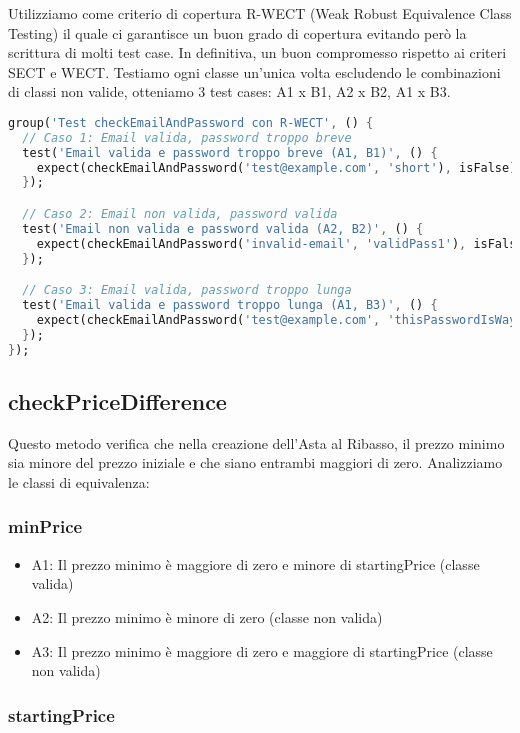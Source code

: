 \noindent
Utilizziamo come criterio di copertura R-WECT (Weak Robust Equivalence Class Testing) il quale ci garantisce un buon grado di copertura evitando però la scrittura di molti test case. In definitiva, un buon compromesso rispetto ai criteri SECT e WECT.\meskip
Testiamo ogni classe un'unica volta escludendo le combinazioni di classi non valide, otteniamo 3 test cases: A1 x B1, A2 x B2, A1 x B3.

\begin{lstlisting}[language=Dart]
group('Test checkEmailAndPassword con R-WECT', () {
  // Caso 1: Email valida, password troppo breve
  test('Email valida e password troppo breve (A1, B1)', () {
    expect(checkEmailAndPassword('test@example.com', 'short'), isFalse);
  });

  // Caso 2: Email non valida, password valida
  test('Email non valida e password valida (A2, B2)', () {
    expect(checkEmailAndPassword('invalid-email', 'validPass1'), isFalse);
  });

  // Caso 3: Email valida, password troppo lunga
  test('Email valida e password troppo lunga (A1, B3)', () {
    expect(checkEmailAndPassword('test@example.com', 'thisPasswordIsWayTooLong'), isFalse);
  });
});
    \end{lstlisting}
\newpage
\subsection{checkPriceDifference}

Questo metodo verifica che nella creazione dell'Asta al Ribasso, il prezzo minimo sia minore del prezzo iniziale e che siano entrambi maggiori di zero.\meskip
Analizziamo le classi di equivalenza:

\subsubsection*{minPrice}

\begin{itemize}
	\item A1: Il prezzo minimo è maggiore di zero e minore di startingPrice (classe valida)
	\item A2: Il prezzo minimo è minore di zero (classe non valida)
	\item A3: Il prezzo minimo è maggiore di zero e maggiore di startingPrice (classe non valida)
\end{itemize}

\subsubsection*{startingPrice}


